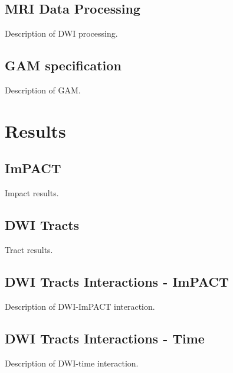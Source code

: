 \documentclass[12pt]{article}
\begin{document}
\subsection{MRI Data Processing}
\label{ssec:meth-mri-proc}
Description of DWI processing.



\subsection{GAM specification}
\label{ssec:meth-gam}
Description of GAM.



\section{Results}
\label{sec:res}

\subsection{ImPACT}
\label{ssec:res-imp}
Impact results.



\subsection{DWI Tracts}
\label{ssec:res-dwi-tract}
Tract results.


\subsection{DWI Tracts Interactions - ImPACT}
\label{ssec:res-dwi-imp}
Description of DWI-ImPACT interaction.


\subsection{DWI Tracts Interactions - Time}
\label{ssec:res-dwi-time}
Description of DWI-time interaction.
\end{document}
